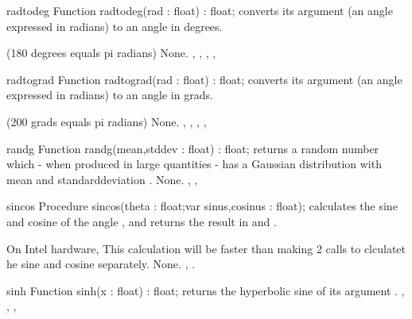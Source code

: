 

\begin{function}{radtodeg}
\Declaration
Function radtodeg(rad : float) : float;
\Description
{} converts its argument  (an angle expressed in
radians) to an angle in degrees.

(180 degrees equals pi radians)
\Errors
None.
\SeeAlso
{}, , ,
, 
\end{function}



\begin{function}{radtograd}
\Declaration
Function radtograd(rad : float) : float;
\Description
{} converts its argument  (an angle expressed in
radians) to an angle in grads.

(200 grads equals pi radians)
\Errors
None.
\SeeAlso
{}, , ,
, 
\end{function}



\begin{function}{randg}
\Declaration
Function randg(mean,stddev : float) : float;
\Description
{} returns a random number which - when produced in large
quantities - has a Gaussian distribution with mean  and 
standarddeviation . 
\Errors
None.
\SeeAlso
{}, , 
\end{function}



\begin{procedure}{sincos}
\Declaration
Procedure sincos(theta : float;var sinus,cosinus : float);
\Description
{} calculates the sine and cosine of the angle ,
and returns the result in  and .

On Intel hardware, This calculation will be faster than making 2 calls
to clculatet he sine and cosine separately.
\Errors
None.
\SeeAlso
{}, .
\end{procedure}



\begin{function}{sinh}
\Declaration
Function sinh(x : float) : float;
\Description
{} returns the hyperbolic sine of its argument .
\Errors
\SeeAlso
{}, , , 
\end{function}

